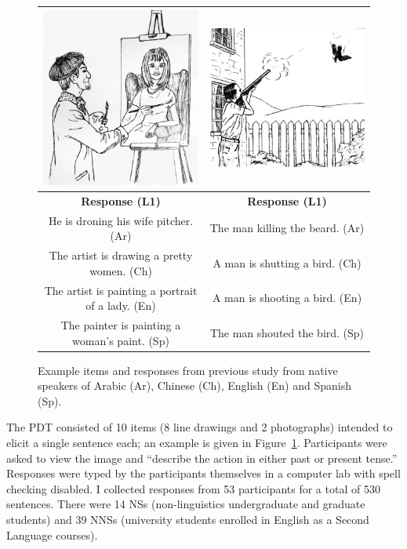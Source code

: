 \begin{figure}[htb!]
\begin{center}
\begin{tabular}{|c||c|}
\hline
\includegraphics[width=0.40\columnwidth]{figures/exampleprompt.jpg} & \includegraphics[width=0.40\columnwidth]{figures/exampleprompt2.jpg}\\
\hline
\textbf{Response (L1)} & \textbf{Response (L1)} \\
\hline
He is droning his wife pitcher. (Ar) & The man killing the beard. (Ar) \\
\hline
The artist is drawing a pretty women. (Ch) & A man is shutting a bird. (Ch) \\
\hline
The artist is painting a portrait of a lady. (En) & A man is shooting a bird. (En) \\
\hline
The painter is painting a woman's paint. (Sp) & The man shouted the bird. (Sp)\\
\hline
\end{tabular}
\end{center}
\caption{Example items and responses from previous study from native speakers of Arabic (Ar), Chinese (Ch), English (En) and Spanish (Sp).}
\label{fig:example-picture}
\end{figure}

The PDT consisted of 10 items (8 line drawings and 2 photographs) intended to elicit a single sentence each; an example is given in Figure~\ref{fig:example-picture}. Participants were asked to view the image and ``describe the action in either past or present tense.'' Responses were typed by the participants themselves in a computer lab with spell checking disabled.
I collected responses from 53 participants for a total of 530 sentences. There were 14 NSs (non-linguistics undergraduate and graduate students) and 39 NNSs (university students enrolled in English as a Second Language courses).


